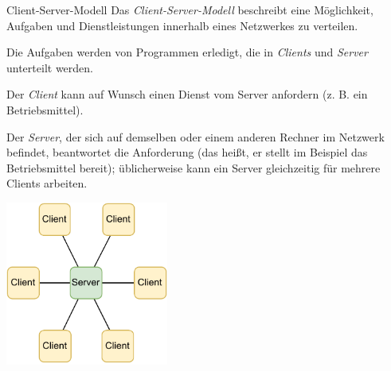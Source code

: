 \begin{defi}{Client-Server-Modell}
    Das \emph{Client-Server-Modell} beschreibt eine Möglichkeit, Aufgaben und Dienstleistungen innerhalb eines Netzwerkes zu verteilen.

    Die Aufgaben werden von Programmen erledigt, die in \emph{Clients} und \emph{Server} unterteilt werden.

    Der \emph{Client} kann auf Wunsch einen Dienst vom Server anfordern (z. B. ein Betriebsmittel).

    Der \emph{Server}, der sich auf demselben oder einem anderen Rechner im Netzwerk befindet, beantwortet die Anforderung (das heißt, er stellt im Beispiel das Betriebsmittel bereit); üblicherweise kann ein Server gleichzeitig für mehrere Clients arbeiten.

    \begin{center}
        \includegraphics[width=0.4\textwidth]{includes/figures/defi_client_server.pdf}
    \end{center}
\end{defi}